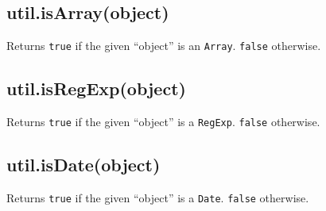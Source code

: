 \subsection{util.isArray(object)}

Returns \texttt{true} if the given ``object'' is an \texttt{Array}.
\texttt{false} otherwise.

\begin{Shaded}
\begin{Highlighting}[]
 \NormalTok{);}

\NormalTok{([])}
\NormalTok{(} \NormalTok{)}
\NormalTok{(\{\})}
\end{Highlighting}
\end{Shaded}

\subsection{util.isRegExp(object)}

Returns \texttt{true} if the given ``object'' is a \texttt{RegExp}.
\texttt{false} otherwise.

\begin{Shaded}
\begin{Highlighting}[]
 \NormalTok{);}

\NormalTok{(}\OtherTok{/}\OtherTok{/}\NormalTok{)}
\NormalTok{(} \NormalTok{(}\NormalTok{))}
\NormalTok{(\{\})}
\end{Highlighting}
\end{Shaded}

\subsection{util.isDate(object)}

Returns \texttt{true} if the given ``object'' is a \texttt{Date}.
\texttt{false} otherwise.

